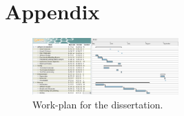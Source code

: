 \documentclass{ueacmpstyle}
\begin{document}
\pagebreak
\appendix
\section{Appendix}
\begin{figure}[h!]
  \centering
    \includegraphics[angle=90, width=0.5\textwidth]{images/workplan.png}
  \caption{Work-plan for the dissertation.}
\end{figure}

\pagebreak


\end{document}
